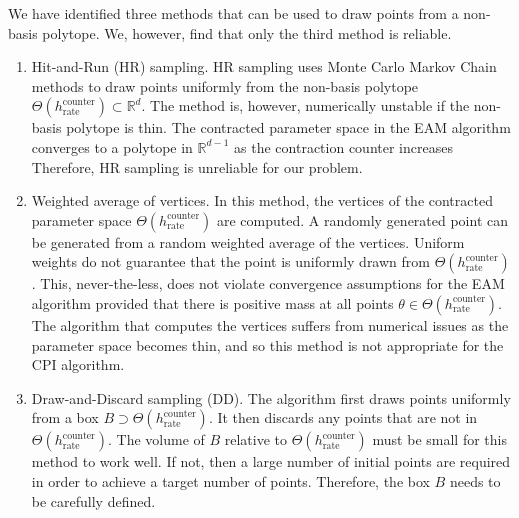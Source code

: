 \documentclass[12pt]{article}
\begin{document}
\begin{appendices}
We have identified three methods that can be used to draw points from a non-basis polytope. We, however, find that only the third method is reliable.
\begin{enumerate}
\item Hit-and-Run (HR) sampling.  HR sampling uses Monte Carlo Markov Chain methods to draw points uniformly from the non-basis polytope $\Theta(h_{\text{rate}}^{\text{counter}}) \subset \mathbb{R}^d$.  The method is, however, numerically unstable if the non-basis polytope is thin. The contracted parameter space in the EAM algorithm converges to a polytope in $\mathbb{R}^{d-1}$ as the contraction counter increases  Therefore, HR sampling is unreliable for our problem.

\item Weighted average of vertices. In this method, the vertices of the contracted parameter space $\Theta(h_{\text{rate}}^{\text{counter}})$ are computed.  A randomly generated point can be generated from a random weighted average of the vertices.  Uniform weights do not guarantee that the point is uniformly drawn from $\Theta(h_{\text{rate}}^{\text{counter}})$.  This, never-the-less, does not violate convergence assumptions for the EAM algorithm provided that there is positive mass at all points $\theta \in \Theta(h_{\text{rate}}^{\text{counter}})$.  The algorithm that computes the vertices suffers from numerical issues as the parameter space becomes thin, and so this method is not appropriate for the CPI algorithm.

\item Draw-and-Discard sampling (DD).  The algorithm first draws points uniformly from a box $B \supset \Theta(h_{\text{rate}}^{\text{counter}})$.  It then discards any points that are not in $\Theta(h_{\text{rate}}^{\text{counter}})$.  The volume of $B$ relative to $\Theta(h_{\text{rate}}^{\text{counter}})$ must be small for this method to work well.  If not, then a large number of initial points are required in order to achieve a target number of points.  Therefore, the box $B$ needs to be carefully defined.
\end{enumerate}


\end{appendices}
\end{document}
